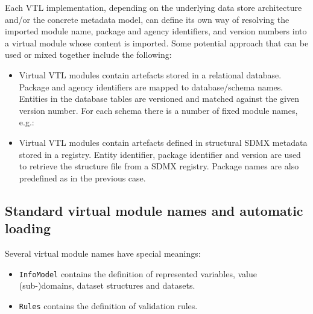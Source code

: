 \documentclass[droidmono,libertine,twoside,user,unofficial]{ecarticle}
\begin{document}
Each VTL implementation, depending on the underlying data store
architecture and/or the concrete metadata model, can define its own
way of resolving the imported module name, package and agency
identifiers, and version numbers into a virtual module whose content
is imported.  Some potential approach that can be used or mixed
together include the following:
\begin{itemize}
\item Virtual VTL modules contain artefacts stored in a relational
  database.  Package and agency identifiers are mapped to
  database/schema names.  Entities in the database tables are
  versioned and matched against the given version number.  For each
  schema there is a number of fixed module names, e.g.:
\item Virtual VTL modules contain artefacts defined in structural SDMX
  metadata stored in a registry.  Entity identifier, package
  identifier and version are used to retrieve the structure file from
  a SDMX registry.  Package names are also predefined as in the
  previous case.
\end{itemize}

\subsection{Standard virtual module names and automatic loading}
\label{sec:virt-module-autol}

Several virtual module names have special meanings:
\begin{itemize}
\item \texttt{InfoModel} contains the definition of represented
  variables, value (sub-)domains, dataset structures and datasets.
  
\item \texttt{Rules} contains the definition of validation rules.
\end{itemize}
\end{document}
